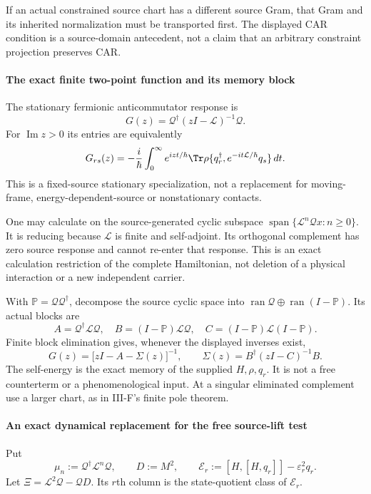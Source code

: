 \documentclass[12pt,a4paper]{article}
\begin{document}
If an actual constrained source chart has a different source Gram, that Gram
and its inherited normalization must be transported first. The displayed CAR
condition is a source-domain antecedent, not a claim that an arbitrary
constraint projection preserves CAR.



\paragraph{The exact finite two-point function and its memory block}
The stationary fermionic anticommutator response is
\[
 \boxed{G(z)=\mathcal Q^\dagger(zI-\mathcal L)^{-1}\mathcal Q.}
\]
For $\operatorname{Im}z>0$ its entries are equivalently
\[
 G_{rs}(z)=-\frac{i}{\hbar}\int_0^\infty e^{izt/\hbar}
 \Tr\rho\{q_r^\dagger,e^{-it\mathcal L/\hbar}q_s\}\,dt.
\]
This is a fixed-source stationary specialization, not a replacement for
moving-frame, energy-dependent-source or nonstationary contacts.

One may calculate on the source-generated cyclic subspace
$\operatorname{span}\{\mathcal L^n\mathcal Qx:n\ge0\}$. It is reducing
because $\mathcal L$ is finite and self-adjoint. Its orthogonal complement
has zero source response and cannot re-enter that response. This is an exact
calculation restriction of the complete Hamiltonian, not deletion of a
physical interaction or a new independent carrier.

With $\mathbb P=\mathcal Q\mathcal Q^\dagger$, decompose the source cyclic
space into $\operatorname{ran}\mathcal Q\oplus\operatorname{ran}(I-\mathbb P)$.
Its actual blocks are
\[
 A=\mathcal Q^\dagger\mathcal L\mathcal Q,
 \quad B=(I-\mathbb P)\mathcal L\mathcal Q,
 \quad C=(I-\mathbb P)\mathcal L(I-\mathbb P).
\]
Finite block elimination gives, whenever the displayed inverses exist,
\[
 \boxed{G(z)=\bigl[zI-A-\Sigma(z)\bigr]^{-1},\qquad
 \Sigma(z)=B^\dagger(zI-C)^{-1}B.}
\]
The self-energy is the exact memory of the supplied $H,\rho,q_r$. It is not
a free counterterm or a phenomenological input. At a singular eliminated
complement use a larger chart, as in III-F's finite pole theorem.



\paragraph{An exact dynamical replacement for the free source-lift test}
Put
\[
 \mu_n:=\mathcal Q^\dagger\mathcal L^n\mathcal Q,
 \qquad D:=M^2,\qquad
 \mathcal E_r:=[H,[H,q_r]]-\varepsilon_r^2q_r.
\]
Let $\Xi=\mathcal L^2\mathcal Q-\mathcal QD$. Its $r$th column is the
state-quotient class of $\mathcal E_r$.
\end{document}
